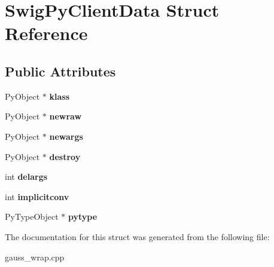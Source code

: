 \hypertarget{struct_swig_py_client_data}{\section{Swig\-Py\-Client\-Data Struct Reference}
\label{struct_swig_py_client_data}
}
\subsection*{Public Attributes}
\begin{DoxyCompactItemize}
\item 
\hypertarget{struct_swig_py_client_data_a482d64908147c310a56d1541476079dc}{Py\-Object $\ast$ {\bfseries klass}}\label{struct_swig_py_client_data_a482d64908147c310a56d1541476079dc}

\item 
\hypertarget{struct_swig_py_client_data_a4da9e7723a1319cb42cda4ad186f65a3}{Py\-Object $\ast$ {\bfseries newraw}}\label{struct_swig_py_client_data_a4da9e7723a1319cb42cda4ad186f65a3}

\item 
\hypertarget{struct_swig_py_client_data_a8f6dacca2c445f175d622fb9264e3715}{Py\-Object $\ast$ {\bfseries newargs}}\label{struct_swig_py_client_data_a8f6dacca2c445f175d622fb9264e3715}

\item 
\hypertarget{struct_swig_py_client_data_a1c4e62712f23db599e85e24e14818d59}{Py\-Object $\ast$ {\bfseries destroy}}\label{struct_swig_py_client_data_a1c4e62712f23db599e85e24e14818d59}

\item 
\hypertarget{struct_swig_py_client_data_a9cb4b9b02743d09dbe216f304e2b7df0}{int {\bfseries delargs}}\label{struct_swig_py_client_data_a9cb4b9b02743d09dbe216f304e2b7df0}

\item 
\hypertarget{struct_swig_py_client_data_a5f9ebdbc04a774559a64b926b6ec4070}{int {\bfseries implicitconv}}\label{struct_swig_py_client_data_a5f9ebdbc04a774559a64b926b6ec4070}

\item 
\hypertarget{struct_swig_py_client_data_a1f172e51bb27f670dacdf8247843b4c2}{Py\-Type\-Object $\ast$ {\bfseries pytype}}\label{struct_swig_py_client_data_a1f172e51bb27f670dacdf8247843b4c2}

\end{DoxyCompactItemize}


The documentation for this struct was generated from the following file\-:\begin{DoxyCompactItemize}
\item 
gauss\-\_\-wrap.\-cpp\end{DoxyCompactItemize}
